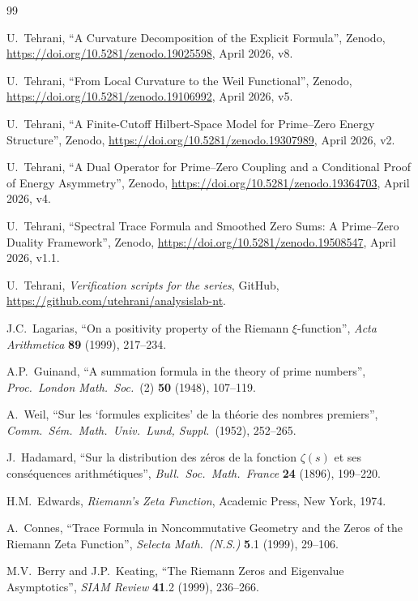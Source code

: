 \documentclass[11pt]{article}
\begin{document}
\begin{thebibliography}{99}

U.~Tehrani,
``A Curvature Decomposition of the Explicit Formula'',
Zenodo, \url{https://doi.org/10.5281/zenodo.19025598},
April 2026, v8.

U.~Tehrani,
``From Local Curvature to the Weil Functional'',
Zenodo, \url{https://doi.org/10.5281/zenodo.19106992},
April 2026, v5.

U.~Tehrani,
``A Finite-Cutoff Hilbert-Space Model
for Prime--Zero Energy Structure'',
Zenodo, \url{https://doi.org/10.5281/zenodo.19307989},
April 2026, v2.

U.~Tehrani,
``A Dual Operator for Prime--Zero Coupling
and a Conditional Proof of Energy Asymmetry'',
Zenodo, \url{https://doi.org/10.5281/zenodo.19364703},
April 2026, v4.

U.~Tehrani,
``Spectral Trace Formula and Smoothed Zero Sums:
A Prime--Zero Duality Framework'',
Zenodo, \url{https://doi.org/10.5281/zenodo.19508547},
April 2026, v1.1.

U.~Tehrani,
\emph{Verification scripts for the series},
GitHub, \url{https://github.com/utehrani/analysislab-nt}.

J.C.~Lagarias,
``On a positivity property of the Riemann $\xi$-function'',
\emph{Acta Arithmetica} \textbf{89} (1999), 217--234.

A.P.~Guinand,
``A summation formula in the theory of prime numbers'',
\emph{Proc.\ London Math.\ Soc.}\ (2) \textbf{50} (1948), 107--119.

A.~Weil,
``Sur les `formules explicites' de la th\'eorie des nombres
premiers'',
\emph{Comm.\ S\'em.\ Math.\ Univ.\ Lund, Suppl.}\ (1952), 252--265.

J.~Hadamard,
``Sur la distribution des z\'eros de la fonction $\zeta(s)$
et ses cons\'equences arithm\'etiques'',
\emph{Bull.\ Soc.\ Math.\ France} \textbf{24} (1896), 199--220.

H.M.~Edwards,
\emph{Riemann's Zeta Function},
Academic Press, New York, 1974.

A.~Connes,
``Trace Formula in Noncommutative Geometry and the Zeros of the
Riemann Zeta Function'',
\emph{Selecta Math.\ (N.S.)} \textbf{5}.1 (1999), 29--106.

M.V.~Berry and J.P.~Keating,
``The Riemann Zeros and Eigenvalue Asymptotics'',
\emph{SIAM Review} \textbf{41}.2 (1999), 236--266.


\end{thebibliography}
\end{document}

